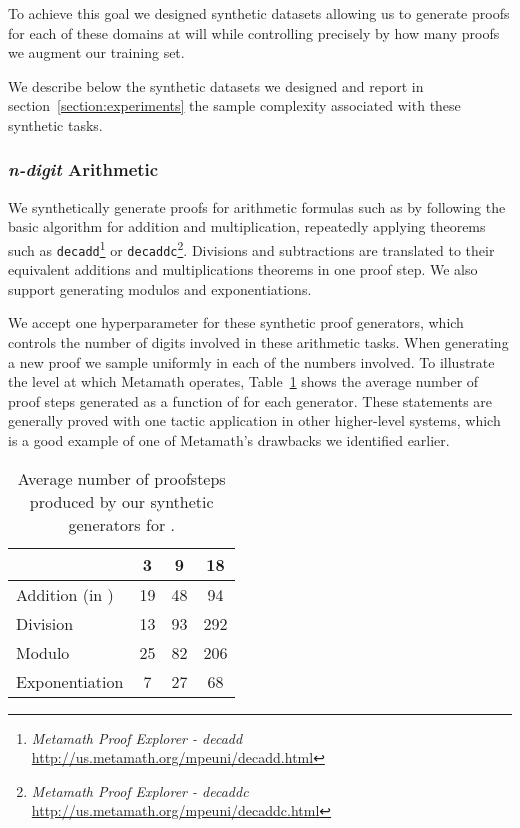 \documentclass{article}
\begin{document}
To achieve this goal we designed synthetic datasets allowing us to generate proofs for each of these domains at will while controlling precisely by how many proofs we augment our training set.

We describe below the synthetic datasets we designed and report in section~\ref{section:experiments} the sample complexity associated with these synthetic tasks.

\subsubsection{\textit{n-digit} Arithmetic}

We synthetically generate proofs for arithmetic formulas such as  by following the basic algorithm for addition and multiplication, repeatedly applying theorems such as \verb|decadd|\footnote{\textit{Metamath Proof Explorer - decadd} \url{http://us.metamath.org/mpeuni/decadd.html}} or \verb|decaddc|\footnote{\textit{Metamath Proof Explorer - decaddc} \url{http://us.metamath.org/mpeuni/decaddc.html}}. Divisions and subtractions are translated to their equivalent additions and multiplications theorems in one proof step. We also support generating modulos and exponentiations.

We accept one hyperparameter for these synthetic proof generators,  which controls the number of digits involved in these arithmetic tasks. When generating a new proof we sample uniformly in  each of the numbers involved. To illustrate the level at which Metamath operates, Table~\ref{table:proofsteps} shows the average number of proof steps generated as a function of  for each generator. These statements are generally proved with one tactic application in other higher-level systems, which is a good example of one of Metamath's drawbacks we identified earlier.

\begin{table}[ht]
\caption{Average number of proofsteps produced by our synthetic generators for .}
\centering
\begin{tabular}{ |l|c|c|c| }
    \hline
     & 3 & 9 & 18 \\
    \hline
    Addition (in ) & 19 & 48 & 94 \\
    Division & 13 & 93 & 292 \\
    Modulo & 25 & 82 & 206 \\
    Exponentiation & 7 & 27 & 68 \\
    \hline
\end{tabular}
\label{table:proofsteps}
\end{table}
\end{document}

